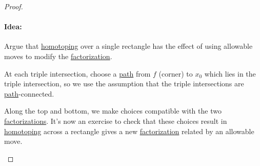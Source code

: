 \begin{proof}
\begin{enumerate}
		      \paragraph{Idea:} Argue that \hyperref[def:homotopy]{homotoping} over a single rectangle has the effect of using allowable moves
		      to modify the \hyperref[def:factorization]{factorization}.

		      \par  At each triple intersection, choose a \hyperref[def:path]{path} from \(f\) (corner) to \(x_0\) which lies in the triple intersection,
		      so we use the assumption that the triple intersections are \hyperref[def:path]{path}-connected.
		      \begin{figure}[H]
			      \centering
			      \label{fig:pf:Seifert-Van-Kampen-thm-3}
		      \end{figure}
		      Along the top and bottom, we make choices compatible with the two \hyperref[def:factorization]{factorizations}. It's now an exercise to
		      check that these choices result in \hyperref[def:homotopy]{homotoping} across a rectangle gives a new \hyperref[def:factorization]{factorization}
		      related by an allowable move.
	\end{enumerate}
\end{proof}
